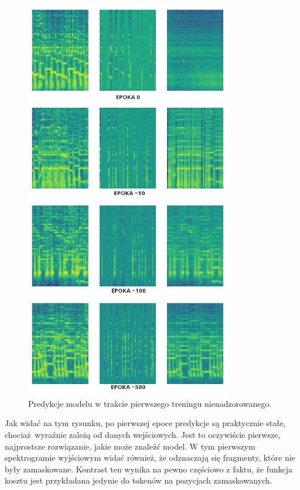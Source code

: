 \begin{figure}
    \centering
    \includegraphics[width=0.8\textwidth]{./images/mae1_predictions.png}
    \caption{Predykcje modelu w trakcie pierwszego treningu nienadzorowanego.}
    \label{fig:mae1_predictions}
\end{figure}

Jak widać na tym rysunku, po pierwszej epoce predykcje są praktycznie stałe, chociaż wyraźnie zależą od danych wejściowych. Jest to oczywiście pierwsze, najprostsze rozwiązanie, jakie może znaleźć model. W tym pierwszym spektrogramie wyjściowym widać również, że odznaczają się fragmenty, które nie były zamaskowane. Kontrast ten wynika na pewno częściowo z faktu, że funkcja kosztu jest przykładana jedynie do tokenów na pozycjach zamaskowanych.


